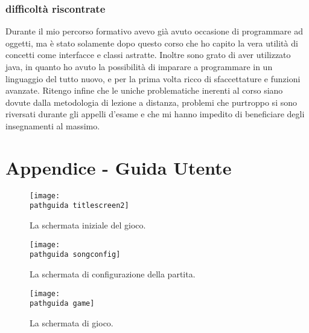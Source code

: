 \documentclass[a4paper,12pt]{report}
\newcommand\pathguida{img/guidautente/}
\begin{document}
\subsection{difficoltà riscontrate}
Durante il mio percorso formativo avevo già avuto occasione di programmare ad oggetti, ma è stato solamente dopo questo corso che ho capito la vera utilità di concetti come interfacce e classi astratte. Inoltre sono grato di aver utilizzato java, in quanto ho avuto la possibilità di imparare a programmare in un linguaggio del tutto nuovo, e per la prima volta ricco di sfaccettature e funzioni avanzate.
Ritengo infine che le uniche problematiche inerenti al corso siano dovute dalla metodologia di lezione a distanza, problemi che purtroppo si sono riversati durante gli appelli d'esame e che mi hanno impedito di beneficiare degli insegnamenti al massimo.
\newpage

\chapter{Appendice - Guida Utente}
\begin{figure}[!htb]
	\centerline{\texttt{[image: \\pathguida titlescreen2]}}
	\caption{La schermata iniziale del gioco.}
	\label{img:title}
\end{figure}
\begin{figure}[!htb]
	\centerline{\texttt{[image: \\pathguida songconfig]}}
	\caption{La schermata di configurazione della partita.}
	\label{img:select}
\end{figure}
\begin{figure}[!htb]
	\centerline{\texttt{[image: \\pathguida game]}}
	\caption{La schermata di gioco.}
	\label{img:game}
\end{figure}
\end{document}
